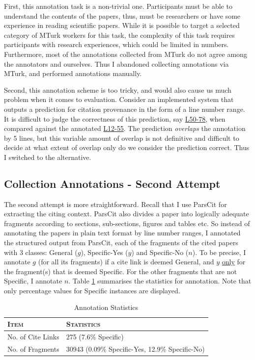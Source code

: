 First, this annotation task is a non-trivial one. Participants must be able to understand the contents of the papers, thus, must be researchers or have some experience in reading scientific papers. While it is possible to target a selected category of MTurk workers for this task, the complexity of this task requires participants with research experiences, which could be limited in numbers. Furthermore, most of the annotations collected from MTurk do not agree among the annotators and ourselves. Thus I abandoned collecting annotations via MTurk, and performed annotations manually.

Second, this annotation scheme is too tricky, and would also cause us much problem when it comes to evaluation. Consider an implemented system that outputs a prediction for citation provenance in the form of a line number range. It is difficult to judge the correctness of this prediction, say \url{L50-78}, when compared against the annotated \url{L12-55}. The prediction \textit{overlaps} the annotation by 5 lines, but this variable amount of overlap is not definitive and difficult to decide at what extent of overlap only do we consider the prediction correct. Thus I switched to the alternative.

\subsection*{Collection Annotations - Second Attempt}
The second attempt is more straightforward. Recall that I use ParsCit for extracting the citing context. ParsCit also divides a paper into logically adequate fragments according to sections, sub-sections, figures and tables etc. So instead of annotating the papers in plain text format by line number ranges, I annotated the structured output from ParsCit, each of the fragments of the cited papers with 3 classes: General ($g$), Specific-Yes ($y$) and Specific-No ($n$). To be precise, I annotate $g$ (for all its fragments) if a cite link is deemed General, and $y$ \underline{only} for the fragment(s) that is deemed Specific. For the other fragments that are not Specific, I annotate $n$. Table \ref{tab:annotation} summarises the statistics for annotation. Note that only percentage values for Specific instances are displayed.

\begin{table}[h]
	\center
	\begin{tabular}{ l | l}
		\textsc{Item} & \textsc{Statistics}\\
		\hline
		No. of Cite Links & 275 (7.6\% Specific) \\
		No. of Fragments & 30943 (0.09\% Specific-Yes, 12.9\% Specific-No)
	\end{tabular}
	\caption{Annotation Statistics}
	\label{tab:annotation}
\end{table}

